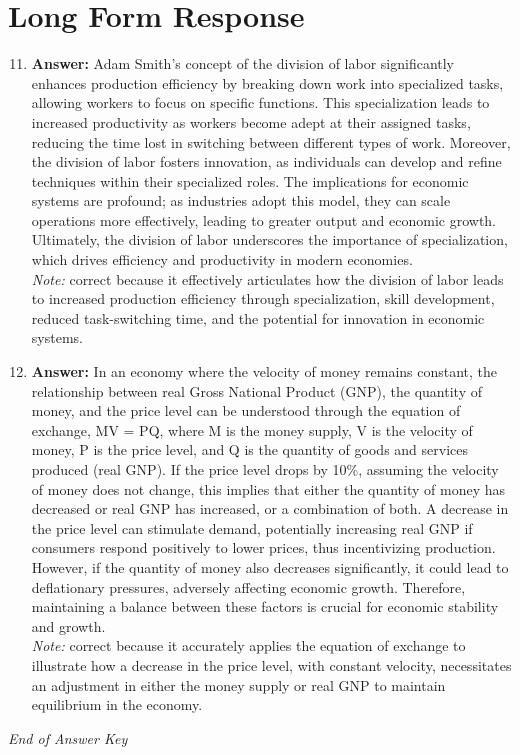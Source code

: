 \documentclass[12pt]{article}
\begin{document}
\section*{Long Form Response}
\begin{enumerate}[label=\arabic*.]
\setcounter{enumi}{10}
\item \textbf{Answer:} Adam Smith's concept of the division of labor significantly enhances production efficiency by breaking down work into specialized tasks, allowing workers to focus on specific functions. This specialization leads to increased productivity as workers become adept at their assigned tasks, reducing the time lost in switching between different types of work. Moreover, the division of labor fosters innovation, as individuals can develop and refine techniques within their specialized roles. The implications for economic systems are profound; as industries adopt this model, they can scale operations more effectively, leading to greater output and economic growth. Ultimately, the division of labor underscores the importance of specialization, which drives efficiency and productivity in modern economies.
\\ \textit{Note:} correct because it effectively articulates how the division of labor leads to increased production efficiency through specialization, skill development, reduced task-switching time, and the potential for innovation in economic systems.
\item \textbf{Answer:} In an economy where the velocity of money remains constant, the relationship between real Gross National Product (GNP), the quantity of money, and the price level can be understood through the equation of exchange, MV = PQ, where M is the money supply, V is the velocity of money, P is the price level, and Q is the quantity of goods and services produced (real GNP). If the price level drops by 10\%, assuming the velocity of money does not change, this implies that either the quantity of money has decreased or real GNP has increased, or a combination of both. A decrease in the price level can stimulate demand, potentially increasing real GNP if consumers respond positively to lower prices, thus incentivizing production. However, if the quantity of money also decreases significantly, it could lead to deflationary pressures, adversely affecting economic growth. Therefore, maintaining a balance between these factors is crucial for economic stability and growth.
\\ \textit{Note:} correct because it accurately applies the equation of exchange to illustrate how a decrease in the price level, with constant velocity, necessitates an adjustment in either the money supply or real GNP to maintain equilibrium in the economy.
\end{enumerate}

\vfill
\noindent\textit{End of Answer Key}
\end{document}
